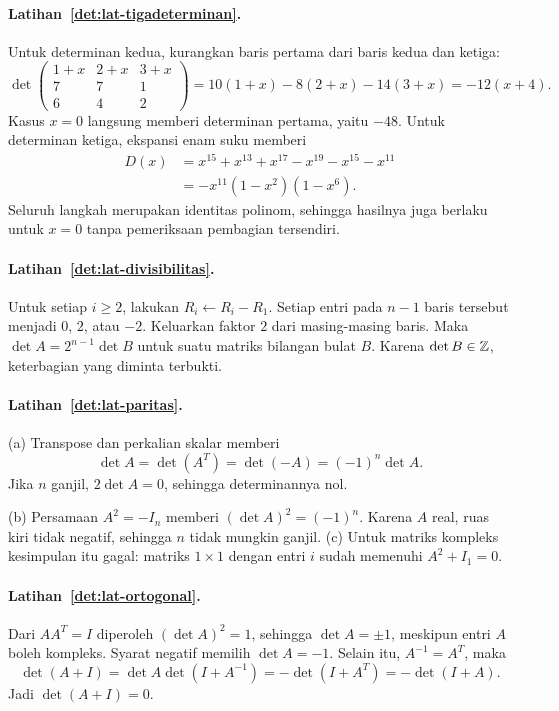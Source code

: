       \paragraph{Latihan~\ref{det:lat-tigadeterminan}.}
      Untuk determinan kedua, kurangkan baris pertama dari baris kedua
      dan ketiga:
      \[
            \det\begin{pmatrix}
                  1+x & 2+x & 3+x \\7&7&1\\6&4&2
            \end{pmatrix}
            =10(1+x)-8(2+x)-14(3+x)=-12(x+4).
      \]
      Kasus $x=0$ langsung memberi determinan pertama, yaitu $-48$.
      Untuk determinan ketiga, ekspansi enam suku memberi
      \begin{align*}
            D(x) & =x^{15}+x^{13}+x^{17}-x^{19}-x^{15}-x^{11} \\
                 & =-x^{11}(1-x^2)(1-x^6).
      \end{align*}
      Seluruh langkah merupakan identitas polinom, sehingga hasilnya juga
      berlaku untuk $x=0$ tanpa pemeriksaan pembagian tersendiri.

      \paragraph{Latihan~\ref{det:lat-divisibilitas}.}
      Untuk setiap $i\ge2$, lakukan $R_i\leftarrow R_i-R_1$.
      Setiap entri pada $n-1$ baris tersebut menjadi $0$, $2$, atau $-2$.
      Keluarkan faktor $2$ dari masing-masing baris. Maka
      $\det A=2^{n-1}\det B$ untuk suatu matriks bilangan bulat $B$.
      Karena $\det B\in\mathbb{Z}$, keterbagian yang diminta terbukti.

      \paragraph{Latihan~\ref{det:lat-paritas}.}
      (a) Transpose dan perkalian skalar memberi
      \[
            \det A=\det(A^T)=\det(-A)=(-1)^n\det A.
      \]
      Jika $n$ ganjil, $2\det A=0$, sehingga determinannya nol.

      (b) Persamaan $A^2=-I_n$ memberi $(\det A)^2=(-1)^n$.
      Karena $A$ real, ruas kiri tidak negatif, sehingga $n$ tidak mungkin
      ganjil. (c) Untuk matriks kompleks kesimpulan itu gagal: matriks
      $1\times1$ dengan entri $i$ sudah memenuhi $A^2+I_1=0$.

      \paragraph{Latihan~\ref{det:lat-ortogonal}.}
      Dari $AA^T=I$ diperoleh $(\det A)^2=1$, sehingga $\det A=\pm1$,
      meskipun entri $A$ boleh kompleks. Syarat negatif memilih $\det A=-1$.
      Selain itu, $A^{-1}=A^T$, maka
      \[
            \det(A+I)=\det A\det(I+A^{-1})
            =-\det(I+A^T)=-\det(I+A).
      \]
      Jadi $\det(A+I)=0$.

